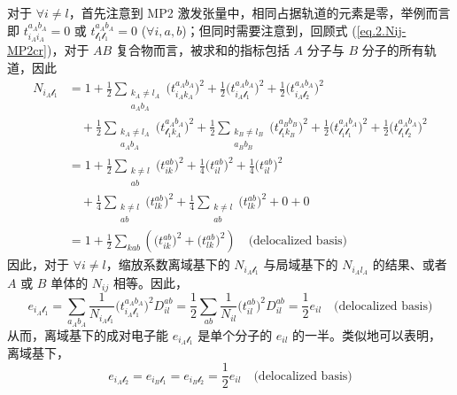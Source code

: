 对于 $\forall i \neq l$，首先注意到 MP2 激发张量中，相同占据轨道的元素是零，举例而言即 $t_{i_A i_A}^{a_A b_A} = 0$ 或 $t_{\mathscr{l}_1 \mathscr{l}_1}^{a_A b_A} = 0$ ($\forall i, a, b$)；但同时需要注意到，回顾式 (\ref{eq.2.Nij-MP2cr})，对于 $AB$ 复合物而言，被求和的指标包括 $A$ 分子与 $B$ 分子的所有轨道，因此
\begingroup
\allowdisplaybreaks
\begin{align*}
  N_{i_A \mathscr{l}_1} &= 1 + \frac{1}{2} \sum_{\substack{k_A \neq l_A \\ a_A b_A}} \big( t_{i_A k_A}^{a_A b_A} \big)^2 + \frac{1}{2} \big( t_{i_A \mathscr{l}_1}^{a_A b_A} \big)^2 + \frac{1}{2} \big( t_{i_A \mathscr{l}_2}^{a_A b_A} \big)^2 \\
  &\quad + \frac{1}{2} \sum_{\substack{k_A \neq l_A \\ a_A b_A}} \big( t_{\mathscr{l}_1 k_A}^{a_A b_A} \big)^2 + \frac{1}{2} \sum_{\substack{k_B \neq l_B \\ a_B b_B}} \big( t_{\mathscr{l}_1 k_B}^{a_B b_B} \big)^2 + \frac{1}{2} \big( t_{\mathscr{l}_1 \mathscr{l}_1}^{a_A b_A} \big)^2 + \frac{1}{2} \big( t_{\mathscr{l}_1 \mathscr{l}_2}^{a_A b_A} \big)^2 \\
  &= 1 + \frac{1}{2} \sum_{\substack{k \neq l \\ ab}} \big( t_{ik}^{ab} \big)^2 + \frac{1}{4} \big( t_{il}^{ab} \big)^2 + \frac{1}{4} \big( t_{il}^{ab} \big)^2 \\
  &\quad + \frac{1}{4} \sum_{\substack{k \neq l \\ ab}} \big( t_{lk}^{ab} \big)^2 + \frac{1}{4} \sum_{\substack{k \neq l \\ ab}} \big( t_{lk}^{ab} \big)^2 + 0 + 0 \\
  &= 1 + \frac{1}{2} \sum_{kab} \left( \big( t_{ik}^{ab} \big)^2 + \big( t_{lk}^{ab} \big)^2 \right) \quad \text{(delocalized basis)}
\end{align*}
\endgroup
因此，对于 $\forall i \neq l$，缩放系数离域基下的 $N_{i_A \mathscr{l}_1}$ 与局域基下的 $N_{i_A l_A}$ 的结果、或者 $A$ 或 $B$ 单体的 $N_{ij}$ 相等。因此，
\begin{equation*}
  e_{i_A \mathscr{l}_1} = \sum_{a_A b_A} \frac{1}{N_{i_A \mathscr{l}_1}} \big( t_{i_A \mathscr{l}_1}^{a_A b_A} \big)^2 D_{il}^{ab} = \frac{1}{2} \sum_{ab} \frac{1}{N_{il}} \big( t_{il}^{ab} \big)^2 D_{il}^{ab} = \frac{1}{2} e_{il} \quad \text{(delocalized basis)}
\end{equation*}
从而，离域基下的成对电子能 $e_{i_A \mathscr{l}_1}$ 是单个分子的 $e_{il}$ 的一半。类似地可以表明，离域基下，
\begin{equation*}
  e_{i_A \mathscr{l}_2} = e_{i_B \mathscr{l}_1} = e_{i_B \mathscr{l}_2} = \frac{1}{2} e_{il} \quad \text{(delocalized basis)}
\end{equation*}

